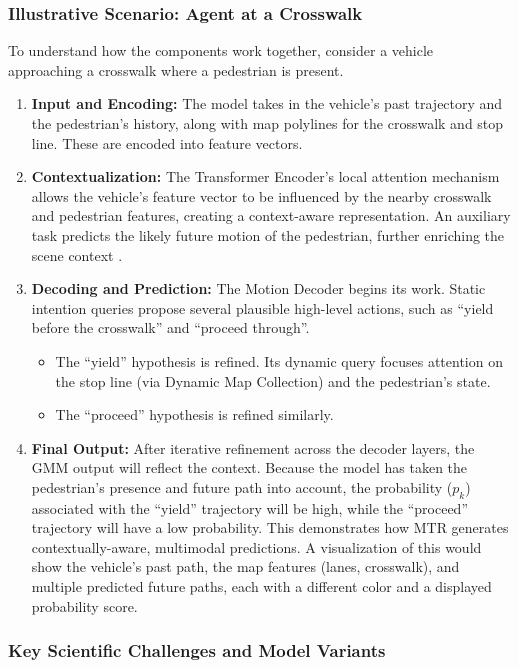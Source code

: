 \subsubsection{Illustrative Scenario: Agent at a Crosswalk}
To understand how the components work together, consider a vehicle approaching a crosswalk where a pedestrian is present.
\begin{enumerate}
    \item \textbf{Input and Encoding:} The model takes in the vehicle's past trajectory and the pedestrian's history, along with map polylines for the crosswalk and stop line. These are encoded into feature vectors.
    \item \textbf{Contextualization:} The Transformer Encoder's local attention mechanism allows the vehicle's feature vector to be influenced by the nearby crosswalk and pedestrian features, creating a context-aware representation. An auxiliary task predicts the likely future motion of the pedestrian, further enriching the scene context \cite{Shi2022MTR}.
    \item \textbf{Decoding and Prediction:} The Motion Decoder begins its work. Static intention queries propose several plausible high-level actions, such as ``yield before the crosswalk'' and ``proceed through''.
    \begin{itemize}
        \item The ``yield'' hypothesis is refined. Its dynamic query focuses attention on the stop line (via Dynamic Map Collection) and the pedestrian's state.
        \item The ``proceed'' hypothesis is refined similarly.
    \end{itemize}
    \item \textbf{Final Output:} After iterative refinement across the decoder layers, the GMM output will reflect the context. Because the model has taken the pedestrian's presence and future path into account, the probability ($p_k$) associated with the ``yield'' trajectory will be high, while the ``proceed'' trajectory will have a low probability. This demonstrates how MTR generates contextually-aware, multimodal predictions. A visualization of this would show the vehicle's past path, the map features (lanes, crosswalk), and multiple predicted future paths, each with a different color and a displayed probability score.
\end{enumerate}

\subsubsection{Key Scientific Challenges and Model Variants}

